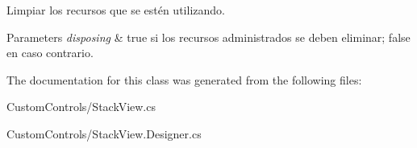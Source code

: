 Limpiar los recursos que se estén utilizando. 


\begin{DoxyParams}{Parameters}
{\em disposing} & true si los recursos administrados se deben eliminar; false en caso contrario.\\
\hline
\end{DoxyParams}


The documentation for this class was generated from the following files\+:\begin{DoxyCompactItemize}
\item 
Custom\+Controls/Stack\+View.\+cs\item 
Custom\+Controls/Stack\+View.\+Designer.\+cs\end{DoxyCompactItemize}
